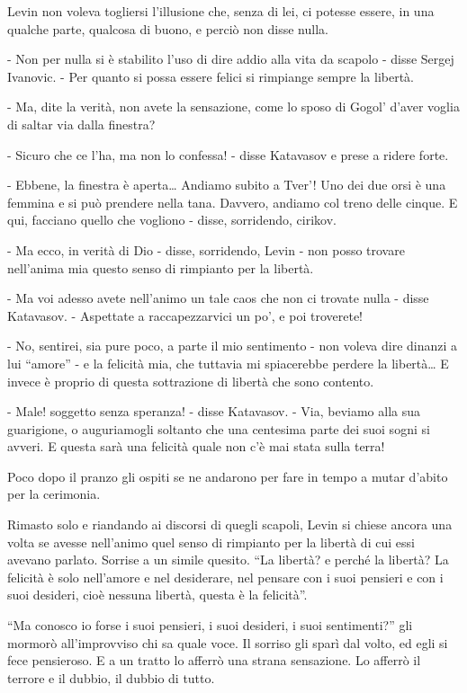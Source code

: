 Levin non voleva togliersi l'illusione che, senza di lei, ci potesse essere, in una qualche parte, qualcosa di buono, e perciò non disse nulla. 

- Non per nulla si è stabilito l'uso di dire addio alla vita da scapolo - disse Sergej Ivanovic. - Per quanto si possa essere felici si rimpiange sempre la libertà. 

- Ma, dite la verità, non avete la sensazione, come lo sposo di Gogol' d'aver voglia di saltar via dalla finestra? 

- Sicuro che ce l'ha, ma non lo confessa! - disse Katavasov e prese a ridere forte. 

- Ebbene, la finestra è aperta\ldots{} Andiamo subito a Tver'! Uno dei due orsi è una femmina e si può prendere nella tana. Davvero, andiamo col treno delle cinque. E qui, facciano quello che vogliono - disse, sorridendo, cirikov. 

- Ma ecco, in verità di Dio - disse, sorridendo, Levin - non posso trovare nell'anima mia questo senso di rimpianto per la libertà. 

- Ma voi adesso avete nell'animo un tale caos che non ci trovate nulla - disse Katavasov. - Aspettate a raccapezzarvici un po', e poi troverete! 

- No, sentirei, sia pure poco, a parte il mio sentimento - non voleva dire dinanzi a lui ``amore'' - e la felicità mia, che tuttavia mi spiacerebbe perdere la libertà\ldots{} E invece è proprio di questa sottrazione di libertà che sono contento. 

- Male! soggetto senza speranza! - disse Katavasov. - Via, beviamo alla sua guarigione, o auguriamogli soltanto che una centesima parte dei suoi sogni si avveri. E questa sarà una felicità quale non c'è mai stata sulla terra! 

Poco dopo il pranzo gli ospiti se ne andarono per fare in tempo a mutar d'abito per la cerimonia. 

Rimasto solo e riandando ai discorsi di quegli scapoli, Levin si chiese ancora una volta se avesse nell'animo quel senso di rimpianto per la libertà di cui essi avevano parlato. Sorrise a un simile quesito. ``La libertà? e perché la libertà? La felicità è solo nell'amore e nel desiderare, nel pensare con i suoi pensieri e con i suoi desideri, cioè nessuna libertà, questa è la felicità''. 

``Ma conosco io forse i suoi pensieri, i suoi desideri, i suoi sentimenti?'' gli mormorò all'improvviso chi sa quale voce. Il sorriso gli sparì dal volto, ed egli si fece pensieroso. E a un tratto lo afferrò una strana sensazione. Lo afferrò il terrore e il dubbio, il dubbio di tutto. 

